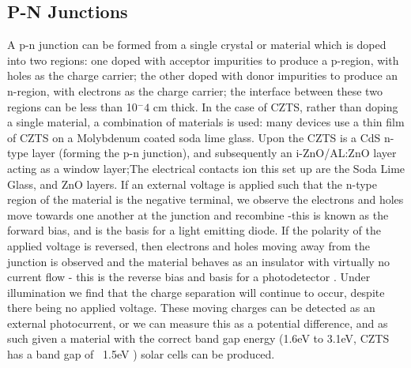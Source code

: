 
\subsection{P-N Junctions}

A p-n junction can be formed from a single crystal or material which is doped into two regions: one doped with acceptor impurities to produce a p-region, with holes as the charge carrier; the other doped with donor impurities to produce an n-region, with electrons as the charge carrier; the interface between these two regions can be less than 10$^-4$ cm thick. \citep{Kittel2004} In the case of CZTS, rather than doping a single material, a combination of materials is used: many devices use a thin film of CZTS on a Molybdenum coated soda lime glass. Upon the CZTS is a CdS n-type layer (forming the p-n junction), and subsequently an i-ZnO/AL:ZnO layer acting as a window layer;The electrical contacts ion this set up are the Soda Lime Glass, and ZnO layers.\citep{Wang2011}
If an external voltage is applied such that the n-type region of the material is the negative terminal, we observe the electrons and holes move towards one another at the junction and recombine -this is  known as the forward bias, and is the basis for a light emitting diode.
If the polarity of the applied voltage is reversed, then electrons and holes moving away from the junction is observed and the material behaves as an insulator with virtually no current flow -  this is the reverse bias and basis for a photodetector \citep{Askeland2010}. Under illumination we find that the charge separation will continue to occur, despite there being no applied voltage. These moving charges can be detected as an external photocurrent, or we can measure this as a potential difference, and as such given a material with the correct band gap energy (1.6eV to 3.1eV, CZTS has a band gap of ~1.5eV \citep{JJAP.48.090202,Katagiri2001}) solar cells can be produced.
